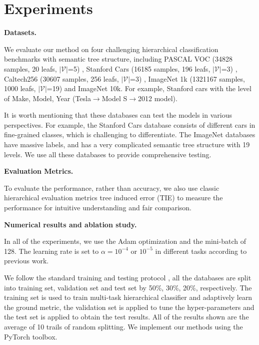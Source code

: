 \documentclass{article}
\theoremstyle{plain}%
\begin{document}
\section{Experiments}

\noindent\textbf{Datasets.}


We evaluate our method on four challenging hierarchical classification benchmarks with semantic tree structure, including PASCAL VOC (34828 samples, 20 leafs, $|\mathcal{V}|$=5) \cite{everingham2010pascal}, Stanford Cars (16185 samples, 196 leafs, $|\mathcal{V}|$=3) \cite{krause2014learning}, Caltech256 (30607 samples, 256 leafs, $|\mathcal{V}|$=3) \cite{griffin2007caltech}, ImageNet 1k (1321167 samples, 1000 leafs, $|\mathcal{V}|$=19) and ImageNet 10k. For example, Stanford cars with the level of Make, Model, Year (Tesla$\rightarrow$Model S$\rightarrow$2012 model).

It is worth mentioning that these databases can test the models in various perspectives. For example,  the Stanford Cars database consists of different cars in fine-grained classes, which is challenging to differentiate. The ImageNet databases have massive labels, and has a very complicated semantic tree structure with 19 levels. We use all these databases to provide comprehensive testing. 

\vspace{+5pt}
\noindent\textbf{Evaluation Metrics.}


To evaluate the performance, rather than accuracy, we also use classic hierarchical evaluation metrics tree induced error (TIE) \cite{ceci2007classifying} to measure the performance for intuitive understanding and fair comparison.

\vspace{+5pt}
\noindent\textbf{Numerical results and ablation study.}


In all of the experiments, we use the Adam optimization and the mini-batch of 128. The learning rate is set to $\alpha=10^{-4}$ or $10^{-5}$ in different tasks according to previous work.






We follow the standard training and testing protocol \cite{wang2020hierarchical,wang2017local}, all the databases are split into training set, validation set and test set by 50\%, 30\%, 20\%, respectively. The training set is used to train multi-task hierarchical classifier and adaptively learn the ground metric, the validation set is applied to tune the hyper-parameters and the test set is applied to obtain the test results. All of the results shown are the average of 10 trails of random splitting. We implement our methods using the PyTorch toolbox.
\end{document}
